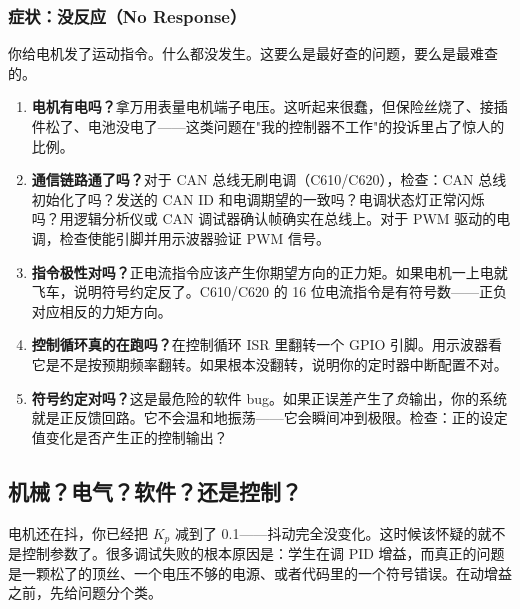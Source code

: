 \subsubsection{症状：没反应（No Response）}

你给电机发了运动指令。什么都没发生。这要么是最好查的问题，要么是最难查的。

\begin{enumerate}
    \item \textbf{电机有电吗？}拿万用表量电机端子电压。这听起来很蠢，但保险丝烧了、接插件松了、电池没电了——这类问题在"我的控制器不工作"的投诉里占了惊人的比例。

    \item \textbf{通信链路通了吗？}对于 CAN 总线无刷电调（C610/C620），检查：CAN 总线初始化了吗？发送的 CAN ID 和电调期望的一致吗？电调状态灯正常闪烁吗？用逻辑分析仪或 CAN 调试器确认帧确实在总线上。对于 PWM 驱动的电调，检查使能引脚并用示波器验证 PWM 信号。

    \item \textbf{指令极性对吗？}正电流指令应该产生你期望方向的正力矩。如果电机一上电就飞车，说明符号约定反了。C610/C620 的 16 位电流指令是有符号数——正负对应相反的力矩方向。

    \item \textbf{控制循环真的在跑吗？}在控制循环 ISR 里翻转一个 GPIO 引脚。用示波器看它是不是按预期频率翻转。如果根本没翻转，说明你的定时器中断配置不对。

    \item \textbf{符号约定对吗？}这是最危险的软件 bug。如果正误差产生了\textit{负}输出，你的系统就是正反馈回路。它不会温和地振荡——它会瞬间冲到极限。检查：正的设定值变化是否产生正的控制输出？
\end{enumerate}

\subsection{机械？电气？软件？还是控制？}

电机还在抖，你已经把 $K_p$ 减到了 0.1——抖动完全没变化。这时候该怀疑的就不是控制参数了。很多调试失败的根本原因是：学生在调 PID 增益，而真正的问题是一颗松了的顶丝、一个电压不够的电源、或者代码里的一个符号错误。在动增益之前，先给问题分个类。

